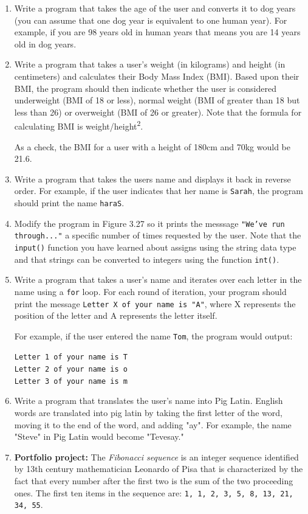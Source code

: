 \documentclass{book}
\begin{document}
\begin{enumerate}
	\item Write a program that takes the age of the user and converts it to dog years (you can assume that one dog year is equivalent to one human year). For example, if you are 98 years old in human years that means you are 14 years old in dog years.
	\item Write a program that takes a user's weight (in kilograms) and height (in centimeters) and calculates their Body Mass Index (BMI). Based upon their BMI, the program should then indicate whether the user is considered underweight (BMI of 18 or less), normal weight (BMI of greater than 18 but less than 26) or overweight (BMI of 26 or greater). Note that the formula for calculating BMI is weight/height\textsuperscript{2}.
	
	As a check, the BMI for a user with a height of 180cm and 70kg would be 21.6.
	\item Write a program that takes the users name and displays it back in reverse order. For example, if the user indicates that her name is \texttt{Sarah}, the program should print the name \texttt{haraS}.
	\item Modify the program in Figure 3.27 so it prints the messsage \texttt{"We've run through..."} a specific number of times requested by the user. Note that the \texttt{input()} function you have learned about assigns using the string data type and that strings can be converted to integers using the function \texttt{int()}.
	\item Write a program that takes a user's name and iterates over each letter in the name using a \texttt{for} loop. For each round of iteration, your program should print the message \texttt{Letter X of your name is "A"}, where X represents the position of the letter and A represents the letter itself.
	
	For example, if the user entered the name \texttt{Tom}, the program would output:
	
	\texttt{Letter 1 of your name is T\\Letter 2 of your name is o\\Letter 3 of your name is m}
	\item Write a program that translates the user's name into Pig Latin. English words are translated into pig latin by taking the first letter of the word, moving it to the end of the word, and adding "ay". For example, the name "Steve" in Pig Latin would become "Tevesay."
	\item \textbf{Portfolio project:} The \textit{Fibonacci sequence} is an integer sequence identified by 13th century mathematician Leonardo of Pisa that is characterized by the fact that every number after the first two is the sum of the two proceeding ones. The first ten items in the sequence are: \texttt{1, 1, 2, 3, 5, 8, 13, 21, 34, 55}.
	

\end{enumerate}
\end{document}
